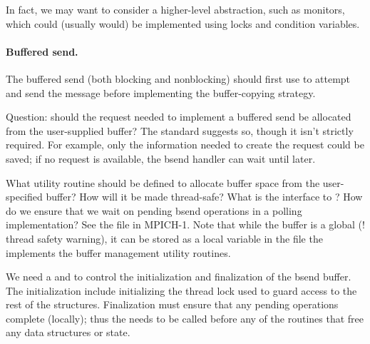 \documentclass{article}
\begin{document}
\begin{adi3}
\begin{mmadi}
In fact, we may want to consider a higher-level abstraction, such as monitors,
which could (usually would) be implemented using locks and condition variables.
\end{mmadi}
\end{adi3}

\paragraph{Buffered send.}
The buffered send (both blocking and nonblocking) should first use
 to attempt 
and send the message before implementing the buffer-copying strategy.

Question: should the request needed to implement a buffered send be allocated
from the user-supplied buffer?  The standard suggests so, though it isn't
strictly required.  For example, only the information needed to create
the request could be saved; if no request is available, the bsend
handler can wait until later.

What utility routine should be defined to allocate buffer space from the
user-specified buffer?  How will it be made thread-safe?  What is the
interface to ?  How do we ensure that we wait on
pending bsend operations in a polling implementation?  See the file
 in MPICH-1.  Note that while the buffer is
a global (! thread safety warning), it can be stored as a local
 variable in the file the implements the buffer
management utility routines.  

We need a  and
 to control the initialization and
finalization of the bsend buffer.  The initialization include
initializing the thread lock used to guard access to the rest of the
structures.   Finalization must ensure that any pending operations
complete (locally); thus the  needs to
be called before any of the routines that free any data structures or state.
\end{document}
